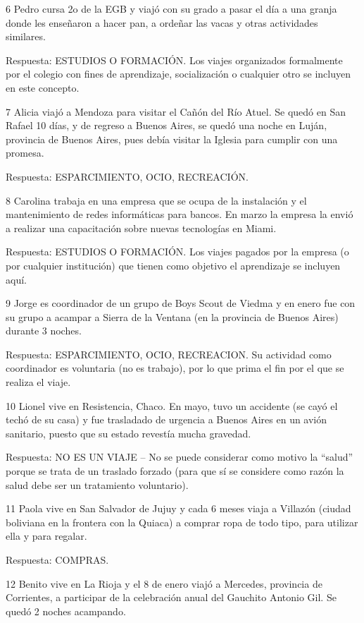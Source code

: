 \documentclass[
  openany]{book}
\begin{document}
6 Pedro cursa 2o de la EGB y viajó con su grado a pasar el día a una granja donde les enseñaron a hacer pan, a ordeñar las vacas y otras actividades similares.

Respuesta: ESTUDIOS O FORMACIÓN. Los viajes organizados formalmente por el colegio con fines de aprendizaje, socialización o cualquier otro se incluyen en este concepto.

7 Alicia viajó a Mendoza para visitar el Cañón del Río Atuel. Se quedó en San Rafael 10 días, y de regreso a Buenos Aires, se quedó una noche en Luján, provincia de Buenos Aires, pues debía visitar la Iglesia para cumplir con una promesa.

Respuesta: ESPARCIMIENTO, OCIO, RECREACIÓN.

8 Carolina trabaja en una empresa que se ocupa de la instalación y el mantenimiento de redes informáticas para bancos. En marzo la empresa la envió a realizar una capacitación sobre nuevas tecnologías en Miami.

Respuesta: ESTUDIOS O FORMACIÓN. Los viajes pagados por la empresa (o por cualquier institución) que tienen como objetivo el aprendizaje se incluyen aquí.

9 Jorge es coordinador de un grupo de Boys Scout de Viedma y en enero fue con su grupo a acampar a Sierra de la Ventana (en la provincia de Buenos Aires) durante 3 noches.

Respuesta: ESPARCIMIENTO, OCIO, RECREACION. Su actividad como coordinador es voluntaria (no es trabajo), por lo que prima el fin por el que se realiza el viaje.

10 Lionel vive en Resistencia, Chaco. En mayo, tuvo un accidente (se cayó el techó de su casa) y fue trasladado de urgencia a Buenos Aires en un avión sanitario, puesto que su estado revestía mucha gravedad.

Respuesta: NO ES UN VIAJE -- No se puede considerar como motivo la ``salud'' porque se trata de un traslado forzado (para que sí se considere como razón la salud debe ser un tratamiento voluntario).

11 Paola vive en San Salvador de Jujuy y cada 6 meses viaja a Villazón (ciudad boliviana en la frontera con la Quiaca) a comprar ropa de todo tipo, para utilizar ella y para regalar.

Respuesta: COMPRAS.

12 Benito vive en La Rioja y el 8 de enero viajó a Mercedes, provincia de Corrientes, a participar de la celebración anual del Gauchito Antonio Gil. Se quedó 2 noches acampando.
\end{document}
